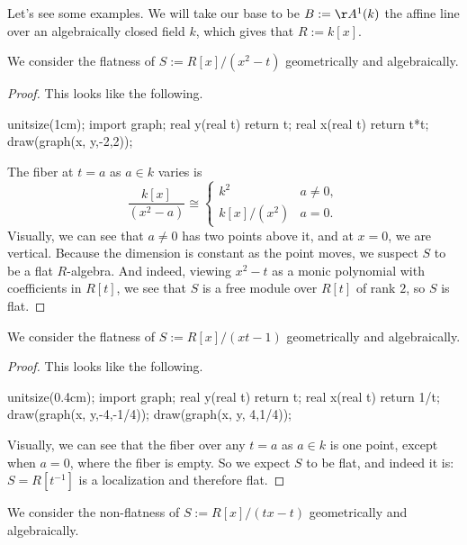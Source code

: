 Let's see some examples. We will take our base to be $B:=\AA^1(k)$ the affine line over an algebraically closed field $k$, which gives that $R:=k[x]$.
\begin{exe}
	We consider the flatness of $S:=R[x]/\left(x^2-t\right)$ geometrically and algebraically.
\end{exe}
\begin{proof}
	This looks like the following.
	\begin{center}
		\begin{asy}
			unitsize(1cm);
			import graph;
			real y(real t)
			{
				return t;
			}
			real x(real t)
			{
				return t*t;
			}
			draw(graph(x, y,-2,2));
		\end{asy}
	\end{center}
	The fiber at $t=a$ as $a\in k$ varies is
	\[\frac{k[x]}{\left(x^2-a\right)}\cong\begin{cases}
		k^2 & a\ne0, \\
		k[x]/\left(x^2\right) & a=0.
	\end{cases}\]
	Visually, we can see that $a\ne0$ has two points above it, and at $x=0$, we are vertical. Because the dimension is constant as the point moves, we suspect $S$ to be a flat $R$-algebra. And indeed, viewing $x^2-t$ as a monic polynomial with coefficients in $R[t]$, we see that $S$ is a free module over $R[t]$ of rank $2$, so $S$ is flat.
\end{proof}
\begin{exe}
	We consider the flatness of $S:=R[x]/\left(xt-1\right)$ geometrically and algebraically.
\end{exe}
\begin{proof}
	This looks like the following.
	\begin{center}
		\begin{asy}
			unitsize(0.4cm);
			import graph;
			real y(real t)
			{
				return t;
			}
			real x(real t)
			{
				return 1/t;
			}
			draw(graph(x, y,-4,-1/4));
			draw(graph(x, y, 4,1/4));
		\end{asy}
	\end{center}
	Visually, we can see that the fiber over any $t=a$ as $a\in k$ is one point, except when $a=0$, where the fiber is empty. So we expect $S$ to be flat, and indeed it is: $S=R\left[t^{-1}\right]$ is a localization and therefore flat.
\end{proof}
\begin{exe}
	We consider the non-flatness of $S:=R[x]/(tx-t)$ geometrically and algebraically.
\end{exe}
